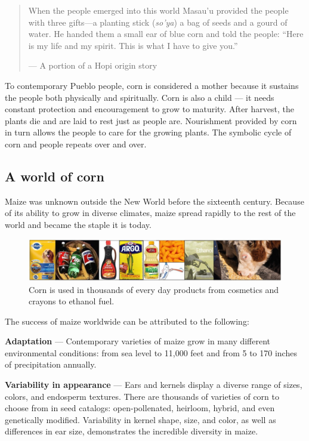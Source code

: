 \documentclass[12pt,]{article}
\begin{document}
\begin{quote}
When the people emerged into this world Masau'u provided the people with three gifts---a planting stick (\emph{so'ya}) a bag of seeds and a gourd of water. He handed them a small ear of blue corn and told the people: ``Here is my life and my spirit. This is what I have to give you.''

--- A portion of a Hopi origin story
\end{quote}

To contemporary Pueblo people, corn is considered a mother because it sustains the people both physically and spiritually. Corn is also a child --- it needs constant protection and encouragement to grow to maturity. After harvest, the plants die and are laid to rest just as people are. Nourishment provided by corn in turn allows the people to care for the growing plants. The symbolic cycle of corn and people repeats over and over.

\hypertarget{a-world-of-corn}{%
\subsection{A world of corn}\label{a-world-of-corn}}

Maize was unknown outside the New World before the sixteenth century. Because of its ability to grow in diverse climates, maize spread rapidly to the rest of the world and became the staple it is today.

\begin{figure}
\centering
\includegraphics{./images/corn_uses.jpg}
\caption{Corn is used in thousands of every day products from cosmetics and crayons to ethanol fuel.}
\end{figure}

The success of maize worldwide can be attributed to the following:

\textbf{Adaptation} --- Contemporary varieties of maize grow in many different environmental conditions: from sea level to 11,000 feet and from 5 to 170 inches of precipitation annually.

\textbf{Variability in appearance} --- Ears and kernels display a diverse range of sizes, colors, and endosperm textures. There are thousands of varieties of corn to choose from in seed catalogs: open-pollenated, heirloom, hybrid, and even genetically modified. Variability in kernel shape, size, and color, as well as differences in ear size, demonstrates the incredible diversity in maize.
\end{document}
